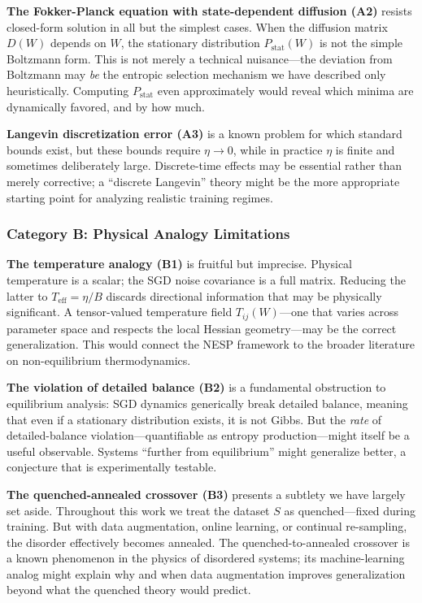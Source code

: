 \documentclass[
  journal=largetwo,
  simfonts=false,
  year=2025,
  volume=37,
]{cup-journal}
\begin{document}
\textbf{The Fokker-Planck equation with state-dependent diffusion (A2)} resists closed-form solution in all but the simplest cases. When the diffusion matrix $D(W)$ depends on $W$, the stationary distribution $P_{\mathrm{stat}}(W)$ is not the simple Boltzmann form. This is not merely a technical nuisance---the deviation from Boltzmann may \emph{be} the entropic selection mechanism we have described only heuristically. Computing $P_{\mathrm{stat}}$ even approximately would reveal which minima are dynamically favored, and by how much.

\textbf{Langevin discretization error (A3)} is a known problem for which standard bounds exist, but these bounds require $\eta \to 0$, while in practice $\eta$ is finite and sometimes deliberately large. Discrete-time effects may be essential rather than merely corrective; a ``discrete Langevin'' theory might be the more appropriate starting point for analyzing realistic training regimes.

\subsubsection{Category B: Physical Analogy Limitations}

\textbf{The temperature analogy (B1)} is fruitful but imprecise. Physical temperature is a scalar; the SGD noise covariance is a full matrix. Reducing the latter to $T_{\mathrm{eff}} = \eta/B$ discards directional information that may be physically significant. A tensor-valued temperature field $T_{ij}(W)$---one that varies across parameter space and respects the local Hessian geometry---may be the correct generalization. This would connect the NESP framework to the broader literature on non-equilibrium thermodynamics.

\textbf{The violation of detailed balance (B2)} is a fundamental obstruction to equilibrium analysis: SGD dynamics generically break detailed balance, meaning that even if a stationary distribution exists, it is not Gibbs. But the \emph{rate} of detailed-balance violation---quantifiable as entropy production---might itself be a useful observable. Systems ``further from equilibrium'' might generalize better, a conjecture that is experimentally testable.

\textbf{The quenched-annealed crossover (B3)} presents a subtlety we have largely set aside. Throughout this work we treat the dataset $S$ as quenched---fixed during training. But with data augmentation, online learning, or continual re-sampling, the disorder effectively becomes annealed. The quenched-to-annealed crossover is a known phenomenon in the physics of disordered systems; its machine-learning analog might explain why and when data augmentation improves generalization beyond what the quenched theory would predict.
\end{document}
